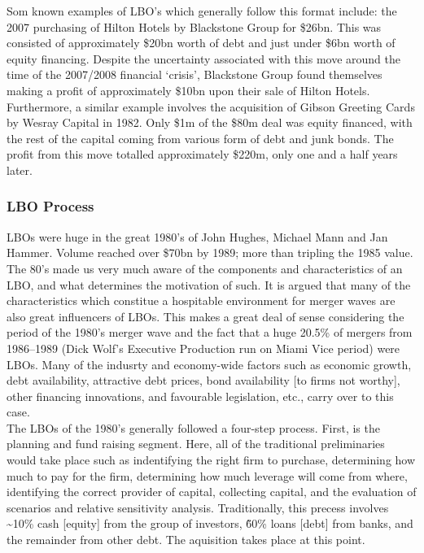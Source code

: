 \documentclass[11pt, english]{article}
\begin{document}
	Som known examples of LBO's which generally follow this format include: the 2007 purchasing of Hilton Hotels by Blackstone Group for \$26bn. This was consisted of approximately \$20bn worth of debt and just under \$6bn worth of equity financing. Despite the uncertainty associated with this move around the time of the 2007/2008 financial `crisis', Blackstone Group found themselves making a profit of approximately \$10bn upon their sale of Hilton Hotels. Furthermore, a similar example involves the acquisition of Gibson Greeting Cards by Wesray Capital in 1982. Only \$1m of the \$80m deal was equity financed, with the rest of the capital coming from various form of debt and junk bonds. The profit from this move totalled approximately \$220m, only one and a half years later.

		\subsubsection*{LBO Process}

	LBOs were huge in the great 1980's of John Hughes, Michael Mann and Jan Hammer. Volume reached over \$70bn by 1989; more than tripling the 1985 value. The 80's made us very much aware of the components and characteristics of an LBO, and what determines the motivation of such. It is argued that many of the characteristics which constitue a hospitable environment for merger waves are also great influencers of LBOs. This makes a great deal of sense considering the period of the 1980's merger wave and the fact that a huge 20.5\% of mergers from 1986--1989 (Dick Wolf's Executive Production run on Miami Vice period) were LBOs. Many of the indusrty and economy-wide factors such as economic growth, debt availability, attractive debt prices, bond availability [to firms not worthy], other financing innovations, and favourable legislation, etc., carry over to this case.\\

	The LBOs of the 1980's generally followed a four-step process. First, is the planning and fund raising segment. Here, all of the traditional preliminaries would take place such as indentifying the right firm to purchase, determining how much to pay for the firm, determining how much leverage will come from where, identifying the correct provider of capital, collecting capital, and the evaluation of scenarios and relative sensitivity analysis. Traditionally, this precess involves \~{}10\% cash [equity] from the group of investors, \~{60}\% loans [debt] from banks, and the remainder from other debt. The aquisition takes place at this point.\\
\end{document}
